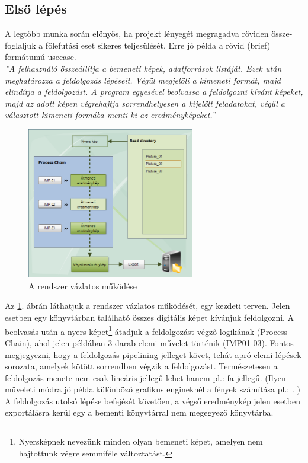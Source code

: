 \documentclass[a4paper,12pt,oneside]{report}
\begin{document}
\subsection{Első lépés}
A legtöbb munka során előnyös, ha projekt lényegét megragadva röviden össze-foglaljuk a főlefutási eset sikeres teljesülését. Erre jó példa a rövid (brief\cite{book:usecase_book_brief}) formátumú usecase.
\\\emph{''A felhasználó összeállítja a bemeneti képek, adatforrások listáját. Ezek után meghatározza a feldolgozás lépéseit. Végül megjelöli a kimeneti formát, majd elindítja a feldolgozást. A program egyesével beolvassa a feldolgozni kívánt képeket, majd az adott képen végrehajtja sorrendhelyesen a kijelölt feladatokat, végül a választott kimeneti formába menti ki az eredményképeket.''}


\begin{figure}[h]
	\begin{center}
	  \includegraphics[width=0.650\textwidth]{read-dir-processing_IMP.jpg}
    \end{center}
	  \caption{A rendszer vázlatos működése}
	  \label{fig:bimg_usecase_brief}
\end{figure}


Az  \ref{fig:bimg_usecase_brief}. ábrán láthatjuk a rendszer vázlatos működését, egy kezdeti terven. Jelen esetben egy könyvtárban található összes digitális képet kívánjuk feldolgozni. A beolvasás után a nyers képet\footnote{Nyersképnek nevezünk minden olyan bemeneti képet, amelyen nem hajtottunk végre semmiféle változtatást.} átadjuk a feldolgozást végző logikának (Process Chain), ahol jelen példában 3 darab elemi művelet történik (IMP01-03). Fontos megjegyezni, hogy a feldolgozás pipelining \cite{book:pipelining_def} jelleget követ, tehát apró elemi lépések sorozata, amelyek kötött sorrendben végzik a feldolgozást. Természetesen a feldolgozás menete nem csak lineáris jellegű lehet hanem pl.: fa jellegű. (Ilyen műveleti módra jó példa különböző grafikus engineknél a fények számítása pl.: \cite{website:valve_shading_tree}. ) A feldolgozás utolsó lépése befejését követően, a végső eredménykép jelen esetben exportálásra kerül egy a bementi könyvtárral nem megegyező könyvtárba.
\end{document}
